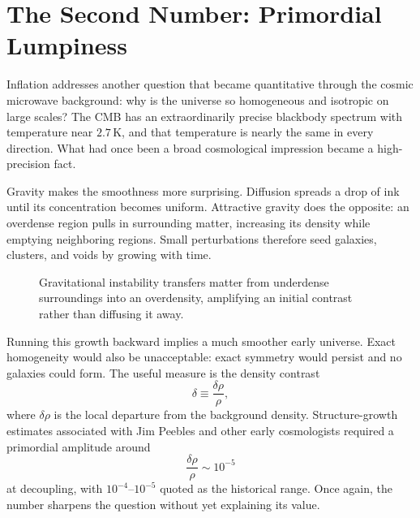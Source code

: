 \section{The Second Number: Primordial Lumpiness}

Inflation addresses another question that became quantitative through the cosmic microwave background: why is the universe so homogeneous and isotropic on large scales? The CMB has an extraordinarily precise blackbody spectrum with temperature near \(2.7\,\mathrm K\), and that temperature is nearly the same in every direction. What had once been a broad cosmological impression became a high-precision fact.

Gravity makes the smoothness more surprising. Diffusion spreads a drop of ink until its concentration becomes uniform. Attractive gravity does the opposite: an overdense region pulls in surrounding matter, increasing its density while emptying neighboring regions. Small perturbations therefore seed galaxies, clusters, and voids by growing with time.

\begin{figure}[htbp]
\centering
\begin{coursefitfigure}
\end{coursefitfigure}
\caption{Gravitational instability transfers matter from underdense surroundings into an overdensity, amplifying an initial contrast rather than diffusing it away.}
\label{fig:c08-gravity-growth}
\end{figure}

Running this growth backward implies a much smoother early universe. Exact homogeneity would also be unacceptable: exact symmetry would persist and no galaxies could form. The useful measure is the density contrast
\begin{equation}
\delta\equiv\frac{\delta\rho}{\rho},
\end{equation}
where \(\delta\rho\) is the local departure from the background density. Structure-growth estimates associated with Jim Peebles and other early cosmologists required a primordial amplitude around
\begin{equation}
\boxed{\frac{\delta\rho}{\rho}\sim10^{-5}}
\end{equation}
at decoupling, with \(10^{-4}\)--\(10^{-5}\) quoted as the historical range. Once again, the number sharpens the question without yet explaining its value.

